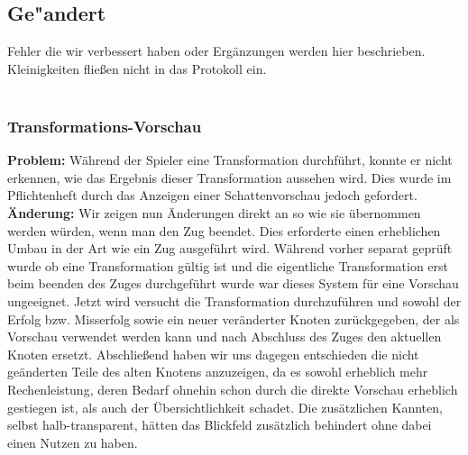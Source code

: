 %



\subsection{Ge{"a}ndert}
\label{Abschnitt:Aenderungen:Protokoll:Behobene_Probleme}

Fehler die wir verbessert haben oder Ergänzungen werden hier beschrieben. Kleinigkeiten fließen nicht in das Protokoll ein.\\~\\











\subsubsection*{Transformations-Vorschau}

\textbf{Problem:}
Während der Spieler eine Transformation durchführt, konnte er nicht erkennen, wie das Ergebnis dieser Transformation aussehen wird.
Dies wurde im Pflichtenheft durch das Anzeigen einer Schattenvorschau jedoch gefordert.\\

\textbf{Änderung:}
Wir zeigen nun Änderungen direkt an so wie sie übernommen werden würden, wenn man den Zug beendet. Dies erforderte einen erheblichen Umbau in der Art wie ein Zug ausgeführt wird.
Während vorher separat geprüft wurde ob eine Transformation gültig ist und die eigentliche Transformation erst beim beenden des Zuges durchgeführt wurde war dieses System für eine Vorschau ungeeignet. Jetzt wird versucht die Transformation durchzuführen und sowohl der Erfolg bzw. Misserfolg sowie ein neuer veränderter Knoten zurückgegeben, der als Vorschau verwendet werden kann und nach Abschluss des Zuges den aktuellen Knoten ersetzt.
Abschließend haben wir uns dagegen entschieden die nicht geänderten Teile des alten Knotens anzuzeigen, da es sowohl erheblich mehr Rechenleistung, deren Bedarf ohnehin schon durch die direkte Vorschau erheblich gestiegen ist, als auch der Übersichtlichkeit schadet. Die zusätzlichen Kannten, selbst halb-transparent, hätten das Blickfeld zusätzlich behindert ohne dabei einen Nutzen zu haben.\\


